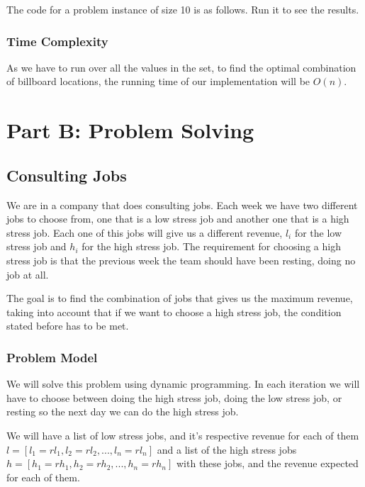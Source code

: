 \documentclass{article}
\begin{document}
The code for a problem instance of size 10 is as follows. Run it to see the results.



\subsubsection*{Time Complexity}
As we have to run over all the values in the set, to find the optimal combination of billboard locations, the running time of our implementation will be $O(n)$.

\section*{Part B: Problem Solving}


\subsection*{Consulting Jobs}

We are in a company that does consulting jobs. Each week we have two different jobs to choose from, one that is a low stress job and another one that is a high stress job. Each one of this jobs will give us a different revenue, $l_i$ for the low stress job and $h_i$ for the high stress job. The requirement for choosing a high stress job is that the previous week the team should have been resting, doing no job at all. 

The goal is to find the combination of jobs that gives us the maximum revenue, taking into account that if we want to choose a high stress job, the condition stated before has to be met.

\subsubsection*{Problem Model}

We will solve this problem using dynamic programming. In each iteration we will have to choose between doing the high stress job, doing the low stress job, or resting so the next day we can do the high stress job.

We will have a list of low stress jobs, and it's respective revenue for each of them $l = [l_1 = rl_1,l_2 = rl_2,...,l_n = rl_n]$ and a list of the high stress jobs $h = [h_1 = rh_1, h_2 = rh_2,...,h_n = rh_n]$ with these jobs, and the revenue expected for each of them.
\end{document}
